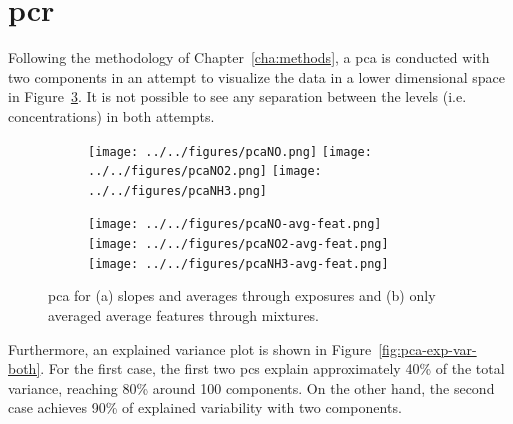 \clearpage
\section{\acrlong{pcr}}
\label{sec:results-pcr}

Following the methodology of Chapter~\ref{cha:methods}, a \acrshort{pca} is conducted with two components in an attempt to visualize the data in a lower dimensional space in Figure~\ref{fig:pca-both}.  It is not possible to see any separation between the levels (i.e. concentrations) in both attempts.

\begin{figure}[!htb]
	\centering
	
	\begin{subfigure}[b]{1\textwidth}
	\texttt{[image: ../../figures/pcaNO.png]}
	\hfill
	\texttt{[image: ../../figures/pcaNO2.png]}
	\hfill
	\texttt{[image: ../../figures/pcaNH3.png]}
	\caption{}
	\label{fig:pca}
	\end{subfigure}
	
	\begin{subfigure}[b]{1\textwidth}
	\texttt{[image: ../../figures/pcaNO-avg-feat.png]}
	\hfill
	\texttt{[image: ../../figures/pcaNO2-avg-feat.png]}
	\hfill
	\texttt{[image: ../../figures/pcaNH3-avg-feat.png]}
	\caption{}
	\label{fig:pca-avg-only}
	\end{subfigure}
	
	\caption{\acrshort{pca} for (a) slopes and averages through exposures and (b) only averaged average features through mixtures.}
	\label{fig:pca-both}
\end{figure}

Furthermore, an explained variance plot is shown in Figure~\ref{fig:pca-exp-var-both}. For the first case, the first two \acrshort{pc}s explain approximately 40\% of the total variance, reaching 80\% around 100 components. On the other hand, the second case achieves 90\% of explained variability with two components.

